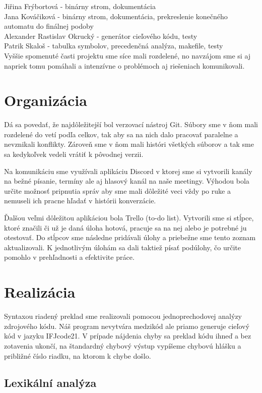 \documentclass[a4paper, 12pt]{article}
\begin{document}
\noindent Jiřina Frýbortová - binárny strom, dokumentácia
\\Jana Kováčiková - binárny strom, dokumentácia, prekreslenie konečného automatu do finálnej podoby
\\Alexander Rastislav Okrucký - generátor cieľového kódu, testy
\\Patrik Skaloš - tabulka symbolov, precedenčná analýza, makefile, testy\\

\noindent Vyššie spomenuté časti projektu sme síce mali rozdelené, no navzájom sme si aj napriek tomu pomáhali a intenzívne o problémoch aj riešeniach komunikovali.

\section{Organizácia}
Dá sa povedať, že najdôležitejší bol verzovací nástroj Git. Súbory sme v ňom mali rozdelené do vetí podľa celkov, tak aby sa na nich dalo pracovať paralelne a nevznikali konflikty. Zároveň sme v ňom mali históri všetkých súborov a tak sme sa kedykoľvek vedeli vrátiť k pôvodnej verzii.

Na komunikáciu sme využívali aplikáciu Discord v ktorej sme si vytvorili kanály na bežné písanie, termíny ale aj hlasový kanál na naše meetingy. Výhodou bola určite možnosť pripnutia správ aby sme mali dôležité veci vždy po ruke a nemuseli ich pracne hľadať v histórii konverzácie. 

Ďalšou veľmi dôležitou aplikáciou bola Trello (to-do list). Vytvorili sme si stĺpce, ktoré značili či už je daná úloha hotová, pracuje sa na nej alebo je potrebné ju otestovať. Do stĺpcov sme následne pridávali úlohy a priebežne sme tento zoznam aktualizovali. K jednotlivým úlohám sa dali taktiež písať podúlohy, čo určite pomohlo v prehľadnosti a efektivite práce.

\section{Realizácia}

Syntaxou riadený preklad sme realizovali pomocou jednoprechodovej analýzy zdrojového kódu. Náš program nevytvára medzikód ale priamo generuje cieľový kód v jazyku IFJcode21. V prípade nájdenia chyby sa preklad kódu ihneď a bez zotavenia ukončí, na štandardný chybový výstup vypíšeme chybovú hlášku a približné číslo riadku, na ktorom k chybe došlo.

\subsection{Lexikální analýza}
\end{document}
